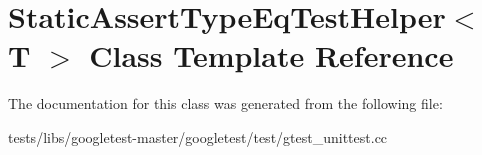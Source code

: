 \hypertarget{classStaticAssertTypeEqTestHelper}{}\section{Static\+Assert\+Type\+Eq\+Test\+Helper$<$ T $>$ Class Template Reference}
\label{classStaticAssertTypeEqTestHelper}


The documentation for this class was generated from the following file\+:\begin{DoxyCompactItemize}
\item 
tests/libs/googletest-\/master/googletest/test/gtest\+\_\+unittest.\+cc\end{DoxyCompactItemize}
